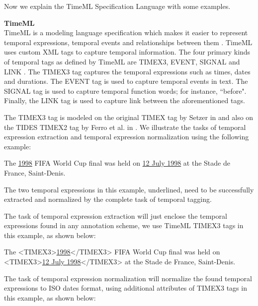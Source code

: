 Now we explain the TimeML Specification Language with some examples. 

\textbf{TimeML}\\ 
TimeML is a modeling language specification which makes it easier to represent temporal expressions, temporal events and relationships between them \cite{DBLP:journals/lre/PustejovskyKLS05}. TimeML uses custom XML tags to capture temporal information. The four primary kinds of temporal tags as defined by TimeML are TIMEX3, EVENT, SIGNAL and LINK \cite{DBLP:conf/ndqa/PustejovskyCISGSKR03, pustejovsky2002annotation, ingria2002timeml}. The TIMEX3 tag captures the temporal expressions such as times, dates and durations. The EVENT tag is used to capture temporal events in text. The SIGNAL tag is used to capture temporal function words; for instance, ``before". Finally, the LINK tag is used to capture link between the aforementioned tags. 

The TIMEX3 tag is modeled on the original TIMEX tag by Setzer in \cite{DBLP:phd/ethos/Setzer01} and also on the TIDES TIMEX2 tag by Ferro et al. in \cite{ferro2001tides, ferro2005tides}. We illustrate the tasks of temporal expression extraction and temporal expression normalization using the following example:

\begin{mdframed}[style=MyFrame]
	\sloppy
	The \ul{1998} FIFA World Cup final was held on \ul{12 July 1998} at the Stade de France, Saint-Denis.
\end{mdframed}

The two temporal expressions in this example, underlined, need to be successfully extracted and normalized by the complete task of temporal tagging.  

The task of temporal expression extraction will just enclose the temporal expressions found in any annotation scheme, we use TimeML TIMEX3 tags in this example, as shown below:

\begin{mdframed}[style=MyFrame]
	\sloppy
	The <TIMEX3>\ul{1998}</TIMEX3> FIFA World Cup final was held on <TIMEX3>\ul{12 July 1998}</TIMEX3> at the Stade de France, Saint-Denis.
\end{mdframed}


The task of temporal expression normalization will normalize the found temporal expressions to ISO dates format, using additional attributes of TIMEX3 tags in this example, as shown below:


